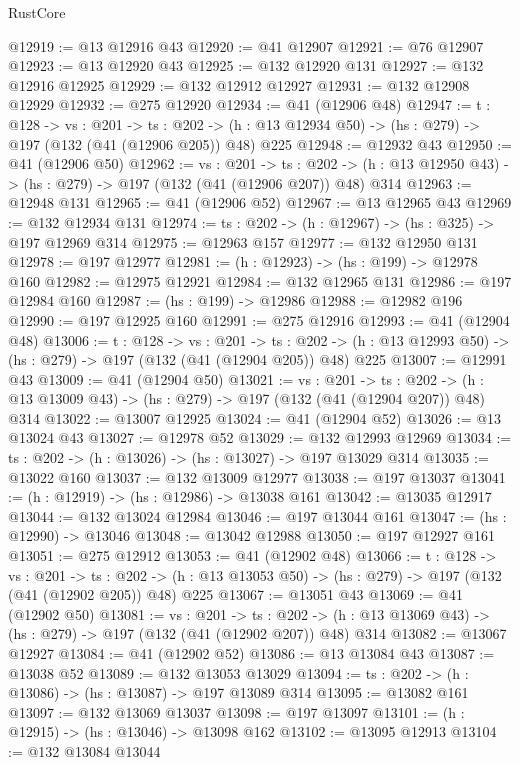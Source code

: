 \begin{lexlean}{RustCore}
\begin{coremodule}
@12919 := @13 @12916 @43
@12920 := @41 @12907
@12921 := @76 @12907
@12923 := @13 @12920 @43
@12925 := @132 @12920 @131
@12927 := @132 @12916 @12925
@12929 := @132 @12912 @12927
@12931 := @132 @12908 @12929
@12932 := @275 @12920
@12934 := @41 (@12906 @48)
@12947 := {t : @128} ->
  {vs : @201} ->
  {ts : @202} -> (h : @13 @12934 @50) -> (hs : @279) -> @197 (@132 (@41 (@12906 @205)) @48) @225
@12948 := @12932 @43
@12950 := @41 (@12906 @50)
@12962 := {vs : @201} ->
  {ts : @202} -> (h : @13 @12950 @43) -> (hs : @279) -> @197 (@132 (@41 (@12906 @207)) @48) @314
@12963 := @12948 @131
@12965 := @41 (@12906 @52)
@12967 := @13 @12965 @43
@12969 := @132 @12934 @131
@12974 := {ts : @202} -> (h : @12967) -> (hs : @325) -> @197 @12969 @314
@12975 := @12963 @157
@12977 := @132 @12950 @131
@12978 := @197 @12977
@12981 := (h : @12923) -> (hs : @199) -> @12978 @160
@12982 := @12975 @12921
@12984 := @132 @12965 @131
@12986 := @197 @12984 @160
@12987 := (hs : @199) -> @12986
@12988 := @12982 @196
@12990 := @197 @12925 @160
@12991 := @275 @12916
@12993 := @41 (@12904 @48)
@13006 := {t : @128} ->
  {vs : @201} ->
  {ts : @202} -> (h : @13 @12993 @50) -> (hs : @279) -> @197 (@132 (@41 (@12904 @205)) @48) @225
@13007 := @12991 @43
@13009 := @41 (@12904 @50)
@13021 := {vs : @201} ->
  {ts : @202} -> (h : @13 @13009 @43) -> (hs : @279) -> @197 (@132 (@41 (@12904 @207)) @48) @314
@13022 := @13007 @12925
@13024 := @41 (@12904 @52)
@13026 := @13 @13024 @43
@13027 := @12978 @52
@13029 := @132 @12993 @12969
@13034 := {ts : @202} -> (h : @13026) -> (hs : @13027) -> @197 @13029 @314
@13035 := @13022 @160
@13037 := @132 @13009 @12977
@13038 := @197 @13037
@13041 := (h : @12919) -> (hs : @12986) -> @13038 @161
@13042 := @13035 @12917
@13044 := @132 @13024 @12984
@13046 := @197 @13044 @161
@13047 := (hs : @12990) -> @13046
@13048 := @13042 @12988
@13050 := @197 @12927 @161
@13051 := @275 @12912
@13053 := @41 (@12902 @48)
@13066 := {t : @128} ->
  {vs : @201} ->
  {ts : @202} -> (h : @13 @13053 @50) -> (hs : @279) -> @197 (@132 (@41 (@12902 @205)) @48) @225
@13067 := @13051 @43
@13069 := @41 (@12902 @50)
@13081 := {vs : @201} ->
  {ts : @202} -> (h : @13 @13069 @43) -> (hs : @279) -> @197 (@132 (@41 (@12902 @207)) @48) @314
@13082 := @13067 @12927
@13084 := @41 (@12902 @52)
@13086 := @13 @13084 @43
@13087 := @13038 @52
@13089 := @132 @13053 @13029
@13094 := {ts : @202} -> (h : @13086) -> (hs : @13087) -> @197 @13089 @314
@13095 := @13082 @161
@13097 := @132 @13069 @13037
@13098 := @197 @13097
@13101 := (h : @12915) -> (hs : @13046) -> @13098 @162
@13102 := @13095 @12913
@13104 := @132 @13084 @13044

\end{coremodule}
\end{lexlean}
